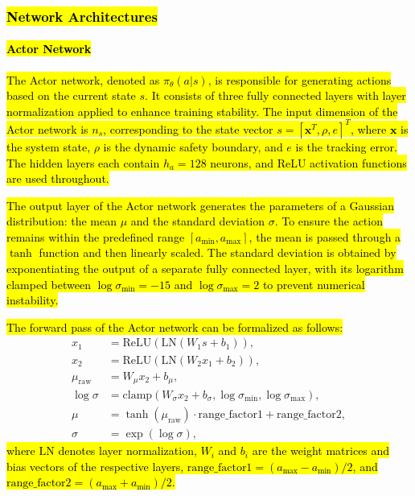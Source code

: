 \documentclass[preprint,12pt]{elsarticle}
\begin{document}
\subsubsection{\hl{Network Architectures}}

\paragraph{\hl{Actor Network}}
\hl{The Actor network, denoted as $\pi_\theta(a|s)$, is responsible for generating actions based on the current state $s$. It consists of three fully connected layers with layer normalization applied to enhance training stability. The input dimension of the Actor network is $n_s$, corresponding to the state vector $s = [\mathbf{x}^T, \rho, e]^T$, where $\mathbf{x}$ is the system state, $\rho$ is the dynamic safety boundary, and $e$ is the tracking error. The hidden layers each contain $h_a = 128$ neurons, and ReLU activation functions are used throughout.}

\hl{The output layer of the Actor network generates the parameters of a Gaussian distribution: the mean $\mu$ and the standard deviation $\sigma$. To ensure the action remains within the predefined range $[a_{\text{min}}, a_{\text{max}}]$, the mean is passed through a $\tanh$ function and then linearly scaled. The standard deviation is obtained by exponentiating the output of a separate fully connected layer, with its logarithm clamped between $\log\sigma_{\text{min}} = -15$ and $\log\sigma_{\text{max}} = 2$ to prevent numerical instability.}

\hl{The forward pass of the Actor network can be formalized as follows:}
\[
\begin{align}
x_1 &= \text{ReLU}(\text{LN}(W_1 s + b_1)), \\
x_2 &= \text{ReLU}(\text{LN}(W_2 x_1 + b_2)), \\
\mu_{\text{raw}} &= W_{\mu} x_2 + b_{\mu}, \\
\log\sigma &= \text{clamp}(W_{\sigma} x_2 + b_{\sigma}, \log\sigma_{\text{min}}, \log\sigma_{\text{max}}), \\
\mu &= \tanh(\mu_{\text{raw}}) \cdot \text{range\_factor1} + \text{range\_factor2}, \\
\sigma &= \exp(\log\sigma),
\end{align}
\]
\hl{where $\text{LN}$ denotes layer normalization, $W_i$ and $b_i$ are the weight matrices and bias vectors of the respective layers, $\text{range\_factor1} = (a_{\text{max}} - a_{\text{min}})/2$, and $\text{range\_factor2} = (a_{\text{max}} + a_{\text{min}})/2$.}
\end{document}
